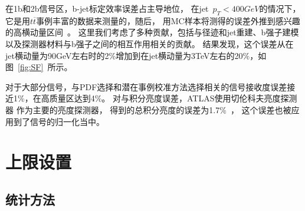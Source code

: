 在1b和2b信号区，b-jet标定效率误差占主导地位，
在jet~$p_{T}<400GeV$的情况下，
它是用$t\overline{t}$事例丰富的数据来测量的，随后，
用MC样本将测得的误差外推到感兴趣的高横动量区间~\cite{FTAG-2018-01}。
这里我们考虑了多种贡献，包括与径迹和jet重建、b强子建模以及探测器材料与b强子之间的相互作用相关的贡献。
结果发现，这个误差从在jet横动量为90GeV左右时的2\%增加到在jet横动量为3TeV左右的20\%，如图~\ref{fig:SF}~所示。

对于大部分信号，与PDF选择和潜在事例校准方法选择相关的信号接收度误差接近1\%，在高质量区达到4\%。
对与积分亮度误差，ATLAS使用切伦科夫亮度探测器
作为主要的亮度探测器，
得到的总积分亮度的误差为1.7\%~\cite{ATLAS-CONF-2019-021}，
这个误差也被应用到了信号的归一化当中。




\section{上限设置} 
\label{sec:DijetSig}

\subsection{统计方法} 
\label{sec:DijetSig1}

